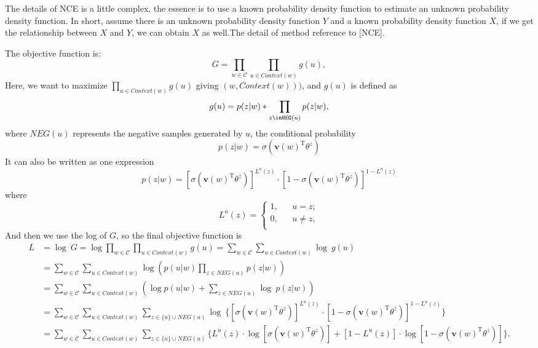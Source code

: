 The details of NCE is a little complex, the essence is to use a known probability density function to estimate an unknown probability density function. In short, assume there is an unknown probability density function $Y$ and a known probability density function $X$, if we get the relationship between $X$ and $Y$, we can obtain $X$ as well.The detail of method reference to [NCE]. 

The objective function is:
\begin{equation}
G=\prod_{w\in\mathcal{C}}\prod_{u\in Context(w)}g(u),
\end{equation}
Here, we want to maximize $\prod_{u\in Context(w)}g(u)$ giving $(w, Context(w)))$,  and $g(u)$ is defined as
$$
g(u)=p(z|w)*\prod_{z\inNEG(u)}p(z|w),
$$
where $NEG(u)$ represents the negative samples generated by $u$, the conditional probability
$$p(z|w)=
\sigma(\mathbf{v}(w)^{\mathrm{T}}\theta^z) 
$$
It can also be written as one expression
\begin{equation}
p(z|w)=[\sigma(\mathbf{v}(w)^{\mathrm{T}}\theta^z)]^{L^u(z)}\cdot[1-\sigma(\mathbf{v}(w)^{\mathrm{T}}\theta^z)]^{1-L^u(z)}
\end{equation}
where  $$L^u(z) = \left\{
\begin{aligned}
1, && u = z;\\
0, && u \neq z,\\
\end{aligned}
\right.
$$
And then we use the log of $G$, so the final objective function is 
\begin{align*}
L & =\log\ G=\log \prod_{w\in\mathcal{C}}\prod_{u\in Context(w)} g(u)=\sum_{w\in\mathcal{C}}\sum_{u\in Context(w)} \log\ g(u) \\
& = \sum_{w\in\mathcal{C}}\sum_{u\in Context(w)} \log\left( p(u|w)\prod_{z\in NEG(u)} p(z|w)\right) \\
& = \sum_{w\in\mathcal{C}}\sum_{u\in Context(w)}\left(\log  p(u|w)+ \sum_{z\in NEG(u)} \log\ p(z|w)\right) \\
& = \sum_{w\in\mathcal{C}}\sum_{u\in Context(w)}\sum_{z\in\{u\}\cup NEG(u)} \log\ \{[\sigma(\mathbf{v}(w)^{\mathrm{T}}\theta^z)]^{L^u(z)}\cdot[1-\sigma(\mathbf{v}(w)^{\mathrm{T}}\theta^z)]^{1-L^u(z)}\} \\
& = \sum_{w\in\mathcal{C}}\sum_{u\in Context(w)}\sum_{z\in\{u\}\cup NEG(u)}\{L^u(z)\cdot \log[\sigma(\mathbf{v}(w)^{\mathrm{T}}\theta^z)]+[1-L^u(z)]\cdot\log[1-\sigma(\mathbf{v}(w)^{\mathrm{T}}\theta^z)]\}.
\end{align*}
